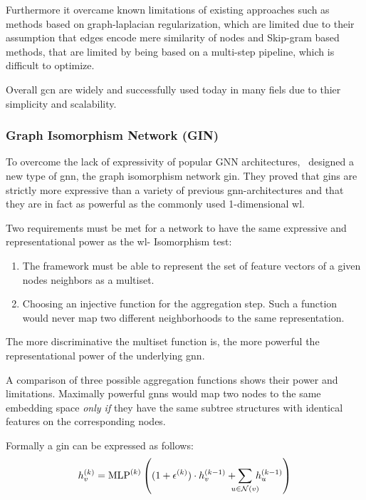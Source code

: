 Furthermore it overcame known limitations of existing approaches such as methods based on
graph-laplacian regularization, which are limited due to their assumption that edges encode
mere similarity of nodes and Skip-gram based methods, that are limited by being based on a
multi-step pipeline, which is difficult to optimize.

Overall \acf{gcn} are widely and successfully used today in many fiels due to thier simplicity
and scalability.

\subsubsection{Graph Isomorphism Network (GIN)}
\label{sec:related:architectures:gin}
To overcome the lack of expressivity of popular GNN architectures,~\cite{Xu2019} designed a new
type of \ac{gnn}, the graph isomorphism network \ac{gin}. They proved that \acp{gin} are strictly
more expressive than a variety of previous \ac{gnn}-architectures and that they are in fact as
powerful as the commonly used 1-dimensional \acf{wl}.

Two requirements must be met for a network to have the same expressive and representational
power as the \ac{wl}- Isomorphism test:
\begin{enumerate}
    \item The framework must be able to represent the set of feature vectors of a given nodes
          neighbors as a multiset.
    \item Choosing an injective function for the aggregation step. Such a function would never
          map two different neighborhoods to the same representation.
\end{enumerate}
The more discriminative the multiset function is, the more powerful the representational power
of the underlying \ac{gnn}.



A comparison of three possible aggregation functions shows their power and limitations.
Maximally powerful \acp{gnn} would map two nodes to the same embedding space \textit{only if}
they have the same subtree structures with identical features on the corresponding nodes.



Formally a \acf{gin} can be expressed as follows:
\begin{align*}
    h^{(k)}_{v}  = \mathrm{MLP}^{(k)} \left((1 + \epsilon^{(k)}) \cdot h^{(k-1)}_{v} + \smashoperator{\sum_{{u} \in{\mathcal{N}(v)}}} \,h^{(k-1)}_{u}\right) \\
\end{align*}

